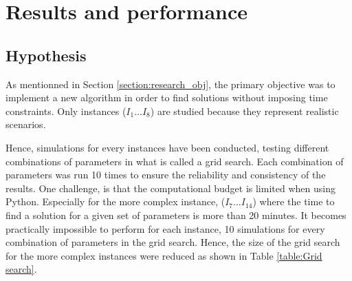 \chapter{Results and performance}
\label{Chapter5}



\section{Hypothesis}
As mentionned in Section \ref{section:research_obj}, the primary objective was to implement a new algorithm in order to find solutions without imposing time constraints. Only instances ($I_1 \ldots I_8$) are studied because they represent realistic scenarios.

Hence, simulations for every instances have been conducted, testing different combinations of parameters in what is called a grid search. Each combination of parameters was run 10 times to ensure the reliability and consistency of the results.
One challenge, is that the computational budget is limited when using Python. Especially for the more complex instance, ($I_7 \ldots I_{14}$) where the time to find a solution for a given set of parameters is more than 20 minutes. It becomes practically impossible to perform for each instance, 10 simulations for every combination of parameters in the grid search. Hence, the size of the grid search for the more complex instances were reduced as shown in Table \ref{table:Grid search}.

